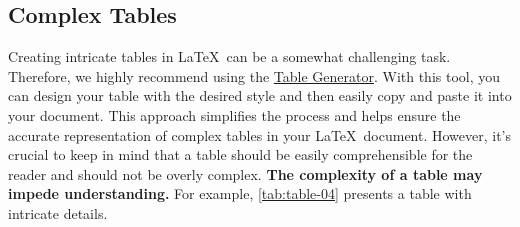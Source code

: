 \subsection{Complex Tables}
Creating intricate tables in \LaTeX\ can be a somewhat challenging task. Therefore, we highly recommend using the \href{https://www.tablesgenerator.com/}{Table Generator}. With this tool, you can design your table with the desired style and then easily copy and paste it into your document. This approach simplifies the process and helps ensure the accurate representation of complex tables in your \LaTeX\ document. However, it's crucial to keep in mind that a table should be easily comprehensible for the reader and should not be overly complex. \textbf{The complexity of a table may impede understanding.} For example, \autoref{tab:table-04} presents a table with intricate details.

